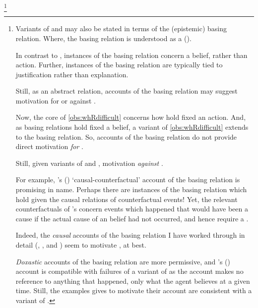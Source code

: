 \begin{note}
  \footnote{
    Variants of \qWhy{} and \qHow{} may also be stated in terms of the (epistemic) basing relation.
    Where, the basing relation is understood as a  (\cite{Korcz:2021ue}).

    In contrast to , instances of the basing relation concern a belief, rather than action.
    Further, instances of the basing relation are typically tied to justification rather than explanation.
    
    Still, as an abstract relation, accounts of the basing relation may suggest motivation for or against \issueInclusion{}.

    Now, the core of \autoref{obs:whRdifficult} concerns how  hold fixed an action.
    And, as basing relations hold fixed a belief, a variant of \autoref{obs:whRdifficult} extends to the basing relation.
    So, accounts of the basing relation do not provide direct motivation \emph{for} \issueInclusion{}.

    Still, given variants of \qWhy{} and \qHow{}, motivation \emph{against} \issueInclusion{}.

    For example, \citeauthor{Swain:1981wd}'s (\citeyear{Swain:1981wd}) `causal-counterfactual' account of the basing relation is promising in name.
    Perhaps there are instances of the basing relation which hold given the causal relations of counterfactual events!
    Yet, the relevant counterfactuals of \citeauthor{Swain:1981wd}'s concern events which happened that would have been a cause if the actual cause of an \agents{} belief had not occurred, and hence require a .

    Indeed, the \emph{causal} accounts of the basing relation I have worked through in detail (\cite{Moser:1989tv}, \cite{Ye:2020ux}, and \cite{Turri:2011aa}) seem to motivate \issueInclusion{}, at best.

    \emph{Doxastic} accounts of the basing relation are more permissive, and \citeauthor{Tolliver:1982us}'s (\citeyear{Tolliver:1982us}) account is compatible with failures of a variant of \issueInclusion{} as the account makes no reference to anything that happened, only what the agent believes at a given time.
    Still, the examples \citeauthor{Tolliver:1982us} gives to motivate their account are consistent with a variant of \issueInclusion{}.

}
\end{note}
